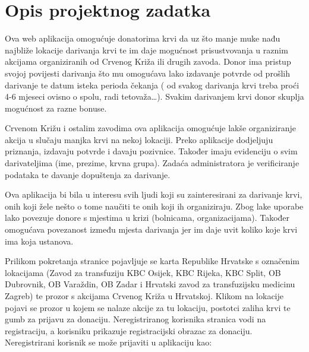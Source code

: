\chapter{Opis projektnog zadatka}
		
		Ova web aplikacija omogućuje donatorima krvi da uz što manje muke nađu najbliže lokacije darivanja krvi te im daje mogućnost prisustvovanja u 				raznim akcijama organiziranih od Crvenog Križa ili drugih zavoda. Donor ima pristup svojoj povijesti darivanja što mu omogućava lako izdavanje 					potvrde od prošlih darivanje te datum isteka perioda čekanja ( od svakog darivanja krvi treba proći 4-6 mjeseci ovisno o spolu, radi tetovaža…). 					Svakim darivanjem krvi donor skuplja mogućnost za razne bonuse.
		
		Crvenom Križu i ostalim zavodima ova aplikacija omogućuje lakše organiziranje akcija u slučaju manjka krvi na nekoj lokaciji. Preko aplikacije 					dodjeljuju priznanja, izdavaju potvrde i davaju pozivnice. Također imaju evidenciju o svim darivateljima (ime, prezime, krvna grupa). Zadaća 					administratora je verificiranje podataka te davanje dopuštenja za darivanje.

		Ova aplikacija bi bila u interesu svih ljudi koji su zainteresirani za darivanje krvi, onih koji žele nešto o tome naučiti te onih koji ih organiziraju. Zbog 				lake uporabe lako povezuje donore s mjestima u krizi (bolnicama, organizacijama). Također omogućava povezanost između mjesta darivanja jer im 				daje uvit koliko koje krvi ima koja ustanova.

		Prilikom pokretanja stranice pojavljuje se karta Republike Hrvatske s označenim lokacijama (Zavod za transfuziju KBC Osijek, KBC Rijeka, KBC Split, OB 		Dubrovnik, OB Varaždin, OB Zadar i Hrvatski zavod za transfuzijsku medicinu Zagreb) te prozor s akcijama Crvenog Križa u Hrvatskoj. Klikom na 					lokacije pojavi se prozor u kojem se nalaze akcije za tu lokaciju, postotci zaliha krvi te gumb za prijavu za donaciju. Neregistriranog korisnika stranica 				vodi na registraciju, a korisniku prikazuje registracijski obrazac za donaciju. 
		Neregistrirani korisnik se može prijaviti u aplikaciju kao:

